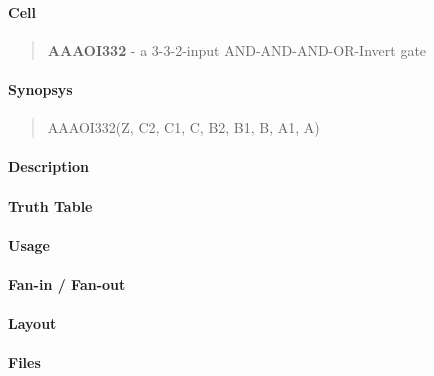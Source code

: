 \label{AAAOI332}
\paragraph{Cell}
\begin{quote}
    \textbf{AAAOI332} - a 3-3-2-input AND-AND-AND-OR-Invert gate
\end{quote}

\paragraph{Synopsys}
\begin{quote}
    AAAOI332(Z, C2, C1, C, B2, B1, B, A1, A)
\end{quote}

\paragraph{Description}



\paragraph{Truth Table}


\paragraph{Usage}

\paragraph{Fan-in / Fan-out}

\paragraph{Layout}

\paragraph{Files}

